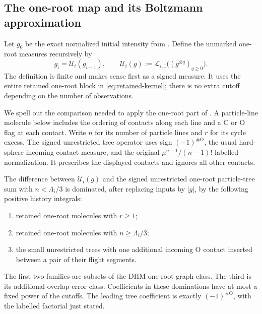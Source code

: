 \subsection{The one-root map and its Boltzmann approximation}

Let $g_0$ be the exact normalized initial intensity from
.  Define the unmarked one-root measures recursively by
\begin{equation}\label{eq:one-root-definition}
 g_i=\mathcal U_i(g_{i-1}),\qquad
 \mathcal U_i(g):=\mathcal L_{i,1}\bigl((g^{\otimes q})_{q\ge0}\bigr).
\end{equation}
The definition is finite and makes sense first as a signed measure.  It
uses the entire retained one-root block in
\eqref{eq:retained-kernel}; there is no extra cutoff depending on the
number of observations.

We spell out the comparison needed to apply the one-root part of
.  A particle-line molecule below includes the
ordering of contacts along each line and a C or O flag at each contact.
Write $n$ for its number of particle lines and $r$ for its cycle excess.
The signed unrestricted tree operator uses sign $(-1)^{\#\mathrm O}$,
the usual hard-sphere incoming contact measure, and the original
$\mu^{n-1}/(n-1)!$ labelled normalization.  It prescribes the displayed
contacts and ignores all other contacts.

\begin{lemma}\label{lem:one-root-bridge}
The difference between $\mathcal U_i(g)$ and the signed unrestricted
one-root particle-tree sum with $n<\Lambda_i/3$ is dominated, after
replacing inputs by $|g|$, by the following positive history integrals:
\begin{enumerate}[label=(\roman*)]
 \item retained one-root molecules with $r\ge1$;
 \item retained one-root molecules with $n\ge\Lambda_i/3$;
 \item the small unrestricted trees with one additional incoming O
 contact inserted between a pair of their flight segments.
\end{enumerate}
The first two families are subsets of the DHM one-root graph class.
The third is its additional-overlap error class.  Coefficients in these
dominations have at most a fixed power of the cutoffs.  The leading
tree coefficient is exactly $(-1)^{\#\mathrm O}$, with the labelled
factorial just stated.
\end{lemma}

